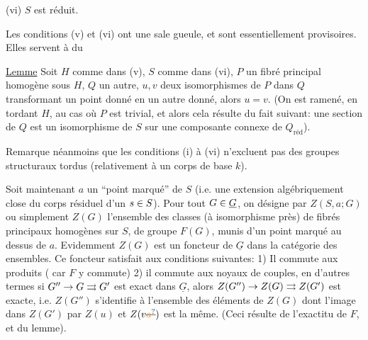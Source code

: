 
(vi) $S$ est réduit.

Les conditions (v) et (vi) ont une sale gueule, et sont essentiellement provisoires. Elles servent à   du

\uline{Lemme} Soit $H$ comme dans (v), $S$ comme dans (vi), $P$ un fibré principal homogène sous $H$, $Q$ un autre, $u,v$ deux isomorphismes de $P$ dans $Q$
transformant un point   donné en un autre donné, alors
$u=v$. (On est ramené, en tordant $H$, au cas où $P$ est trivial, et
alors cela résulte du fait suivant: une section de $Q$ est un isomorphisme de $S$ sur une composante connexe de $Q_{\text{réd}}$).

Remarque néanmoins que les conditions (i) à (vi) n'excluent
pas des groupes structuraux tordus (relativement à un corps de base
$k$).

Soit maintenant $a$ un ``point marqué'' de $S$ (i.e. une extension
algébriquement close du corps résiduel d'un $s\in S$). Pour tout $G\in\underline G$,
on désigne par $Z(S,a;G)$ ou simplement $Z(G)$ l'ensemble des classes
(à isomorphisme près) de fibrés principaux homogènes sur $S$, de
groupe $F(G)$, munis d'un point marqué au dessus de $a$. Evidemment
$Z(G)$ est un foncteur de $\underline G$ dans la catégorie des ensembles. Ce
foncteur satisfait aux conditions suivantes: 1) Il commute aux
produits ( car $F$ y commute) 2) il commute aux noyaux
de couples, en d'autres termes si $G''\to G\rightrightarrows G'$ est exact dans $\underline G$,
alors $Z(G'')\to Z(G)\rightrightarrows Z(G')$ est exacte, i.e. $Z(G'')$ s'identifie
à l'ensemble des éléments de $Z(G)$ dont l'image dans $Z(G')$ par $Z(u)$
\deleted{\unsure{(}}et $Z(v\deleted{\unsure{a}})$ est la même. (Ceci résulte de l'exactitu de $F$, et du
lemme). 

